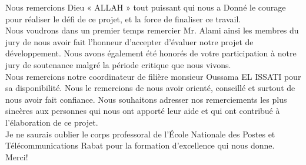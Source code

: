 
\usetikzlibrary{fadings,backgrounds}


\thispagestyle{empty}
%
\vfill 
\begin{center}
	\parbox{.77\linewidth}{  \centering 
		\baselineskip=8mm 
		\selectfont 
		\Large 
		Nous remercions Dieu « ALLAH » tout puissant qui nous a
		Donné le courage pour réaliser le défi de ce projet, et la force de
		finaliser ce travail.
		\\[5mm]
		Nous voudrons dans un premier temps remercier  Mr. Alami ainsi les membres du jury de nous
		avoir fait l’honneur d’accepter d’évaluer notre projet de
		développement. Nous avons également été honorés de votre
		participation à notre jury de soutenance malgré la période critique
		que nous vivons.
		\\[5mm]
		Nous remercions notre coordinateur de filière monsieur Oussama
		EL ISSATI pour sa disponibilité. Nous le remercions de nous avoir orienté, conseillé et surtout de nous avoir fait confiance.
		Nous souhaitons adresser nos remerciements les plus sincères
		aux personnes qui nous ont apporté leur aide et qui ont contribué à
		l’élaboration de ce projet.
		\\[5mm]
		Je ne saurais oublier le corps professoral de l’École Nationale des Postes et
		Télécommunications Rabat pour la formation d’excellence qui nous donne.
		\\[5mm]
		Merci!}
\end{center}
\vfill 
\vskip11mm
\newpage